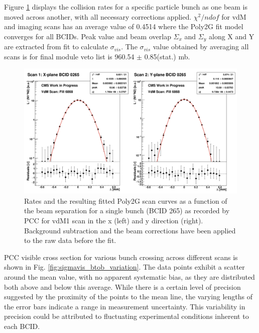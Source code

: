 Figure \ref{fig:fitquality} displays the collision rates for a specific particle bunch as one beam is moved across another, with all necessary corrections applied. $\chi^2/ndof$ for vdM and imaging scans has an average value of 0.4514 where the Poly2G fit model converges for all BCIDs. Peak value and beam overlap $\Sigma_x$ and $\Sigma_y$ along X and Y are extracted from fit to calculate $\sigma_{vis}$. %
The $\sigma_{vis}$ value obtained by averaging all scans is for final module veto list is 960.54 $\pm$ 0.85(stat.) mb.

\begin{figure}[!htp]
    \centering
    \includegraphics[width=1\textwidth]{ashish_thesis/vdM_fit_cveto_1.png}
    \caption[PCC Rate Fit]{Rates and the resulting fitted Poly2G scan curves as a function of the beam separation for a single bunch (BCID 265) as recorded by PCC for vdM1 scan in the x (left) and y direction (right). Background subtraction and the beam corrections have been applied to the raw data before the fit.}
    \label{fig:fitquality}
\end{figure}


PCC visible cross section for various bunch crossing across different scans is shown in Fig. \ref{fig:sigmavis_btob_variation}. The data points exhibit a scatter around the mean value, with no apparent systematic bias, as they are distributed both above and below this average. While there is a certain level of precision suggested by the proximity of the points to the mean line, the varying lengths of the error bars indicate a range in measurement uncertainty. This variability in precision could be attributed to fluctuating experimental conditions inherent to each BCID. %

